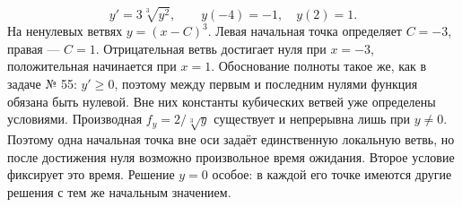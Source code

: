 \[
 y'=3\sqrt[3]{y^2},\qquad y(-4)=-1,\quad y(2)=1.
\]
На ненулевых ветвях $y=(x-C)^3$. Левая начальная точка определяет
$C=-3$, правая --- $C=1$. Отрицательная ветвь достигает нуля при
$x=-3$, положительная начинается при $x=1$.
Обоснование полноты такое же, как в задаче № 55: $y'\ge0$, поэтому
между первым и последним нулями функция обязана быть нулевой.
Вне них константы кубических ветвей уже определены условиями.
Производная $f_y=2/\sqrt[3]y$ существует и непрерывна лишь при $y\ne0$.
Поэтому одна начальная точка вне оси задаёт единственную локальную
ветвь, но после достижения нуля возможно произвольное время ожидания.
Второе условие фиксирует это время. Решение $y=0$ особое: в каждой его
точке имеются другие решения с тем же начальным значением.

\begin{center}
\end{center}
